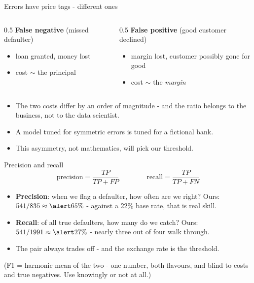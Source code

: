 \documentclass[10pt,aspectratio=169]{beamer}
\begin{document}
\begin{frame}{Errors have price tags - different ones}
  \begin{columns}[T]
    \begin{column}{0.5\textwidth}
      \textbf{False negative} (missed defaulter)
      \begin{itemize}\small
        \item loan granted, money lost
        \item cost $\sim$ the \alert{principal}
      \end{itemize}
    \end{column}
    \begin{column}{0.5\textwidth}
      \textbf{False positive} (good customer declined)
      \begin{itemize}\small
        \item margin lost, customer possibly gone for good
        \item cost $\sim$ the \emph{margin}
      \end{itemize}
    \end{column}
  \end{columns}
  \vspace{0.7em}
  \begin{itemize}\small
    \item The two costs differ by an \alert{order of magnitude} - and the
          ratio belongs to the business, not to the data scientist.
    \item A model tuned for symmetric errors is tuned for a fictional bank.
    \item This asymmetry, not mathematics, will pick our threshold.
  \end{itemize}
\end{frame}

\begin{frame}{Precision and recall}
  \[
    \text{precision} = \frac{TP}{TP + FP}
    \qquad\qquad
    \text{recall} = \frac{TP}{TP + FN}
  \]
  \vspace{0.2em}
  \begin{itemize}\small
    \item \textbf{Precision}: when we flag a defaulter, how often are we
          right? Ours: $541/835 \approx \alert{65\%}$ - against a 22\%
          base rate, that is real skill.
    \item \textbf{Recall}: of all true defaulters, how many do we catch?
          Ours: $541/1991 \approx \alert{27\%}$ - nearly three out of four
          walk through.
    \item The pair always trades off - and the exchange rate is the
          threshold.
  \end{itemize}
  \vspace{0.4em}
  \begin{center}\small
    (F1 = harmonic mean of the two - one number, both flavours, and blind to
    costs and true negatives. Use knowingly or not at all.)
  \end{center}
\end{frame}
\end{document}
